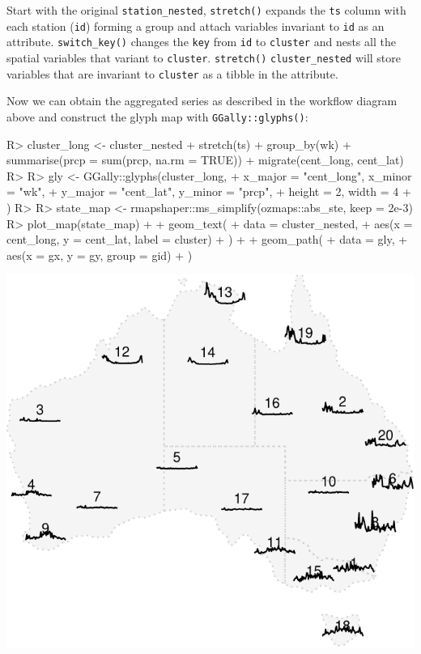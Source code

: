 \documentclass[
]{jss}
\begin{document}
Start with the original \texttt{station\_nested}, \texttt{stretch()}
expands the \texttt{ts} column with each station (\texttt{id}) forming a
group and attach variables invariant to \texttt{id} as an attribute.
\texttt{switch\_key()} changes the \texttt{key} from \texttt{id} to
\texttt{cluster} and nests all the spatial variables that variant to
\texttt{cluster}. \texttt{stretch()} \texttt{cluster\_nested} will store
variables that are invariant to \texttt{cluster} as a tibble in the
attribute.

Now we can obtain the aggregated series as described in the workflow
diagram above and construct the glyph map with
\texttt{GGally::glyphs()}:

\begin{CodeChunk}
\begin{CodeInput}
R> cluster_long <- cluster_nested %
+   stretch(ts) %
+   group_by(wk) %
+   summarise(prcp = sum(prcp, na.rm = TRUE)) %
+   migrate(cent_long, cent_lat)
R> 
R> gly <- GGally::glyphs(cluster_long,
+   x_major = "cent_long", x_minor = "wk",
+   y_major = "cent_lat", y_minor = "prcp",
+   height = 2, width = 4
+ )
R> 
R> state_map <- rmapshaper::ms_simplify(ozmaps::abs_ste, keep = 2e-3)
R> plot_map(state_map) +
+   geom_text(
+     data = cluster_nested,
+     aes(x = cent_long, y = cent_lat, label = cluster)
+   ) +
+   geom_path(
+     data = gly,
+     aes(x = gx, y = gy, group = gid)
+   )
\end{CodeInput}


\begin{center}\includegraphics{figures/unnamed-chunk-15-1} \end{center}

\end{CodeChunk}
\end{document}
